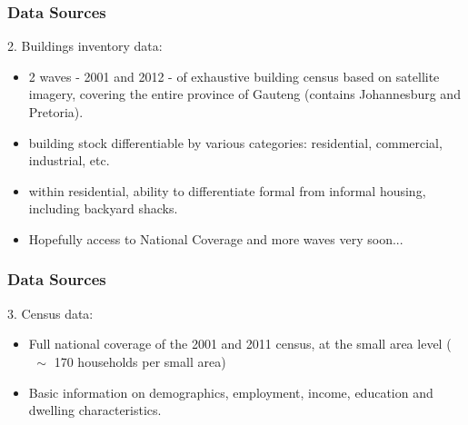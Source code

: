 \documentclass[aspectratio=149]{beamer}
\begin{document}
\begin{frame}
\frametitle{Data Sources}
2. Buildings inventory data:
\vspace{2mm}
  \begin{itemize}
    \item 2 waves - 2001 and 2012 - of exhaustive building census based on satellite imagery, covering the entire province of Gauteng (contains Johannesburg and Pretoria).
    \vspace{2mm}
    \item building stock differentiable by various categories: residential, commercial, industrial, etc.
    \vspace{2mm}
    \item within residential, ability to differentiate formal from informal housing, including backyard shacks.
    \vspace{2mm}
    \item Hopefully access to National Coverage and more waves very soon...
\end{itemize}
\end{frame}

\begin{frame}
\frametitle{Data Sources}
3. Census data:
\vspace{2mm}
  \begin{itemize}
    \item Full national coverage of the 2001 and 2011 census, at the small area level ($\,\,\sim$ 170 households per small area)
    \vspace{2mm}
    \item  Basic information on demographics, employment, income, education and dwelling characteristics.

\end{itemize}
\end{frame}


\end{document}
